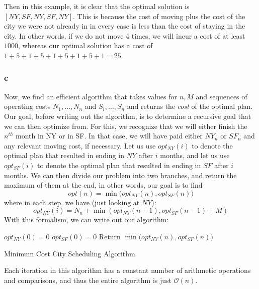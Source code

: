 \documentclass[11pt,letterpaper]{article}
\begin{document}
Then in this example, it is clear that the optimal solution is $[NY, SF, NY, SF, NY]$. This is because the cost of moving plus the cost of the city we were not already in in every case is less than the cost of staying in the city. In other words, if we do not move 4 times, we will incur a cost of at least $1000$, whereas our optimal solution has a cost of $1 + 5 + 1 + 5 + 1 + 5 + 1 + 5 + 1 = 25$. 

\subsubsection*{c} Now, we find an efficient algorithm that takes values for $n, M$ and sequences of operating costs $N_1,\ldots,N_n$ and $S_i,\ldots,S_n$ and returns the \textit{cost} of the optimal plan. Our goal, before writing out the algorithm, is to determine a recursive goal that we can then optimize from. For this, we recognize that we will either finish the $n^{th}$ month in NY or in SF. In that case, we will have paid either $NY_n$ or $SF_n$ and any relevant moving cost, if necessary. Let us use $opt_{NY}(i)$ to denote the optimal plan that resulted in ending in $NY$ after $i$ months, and let us use $opt_{SF}(i)$ to denote the optimal plan that resulted in ending in $SF$ after $i$ months. We can then divide our problem into two branches, and return the maximum of them at the end, in other words, our goal is to find 
\begin{equation*}
	opt(n) = \min\Big( opt_{NY}(n), opt_{SF}(n) \Big)
\end{equation*}
where in each step, we have (just looking at $NY$):
\begin{equation*}
	opt_{NY}(i) = N_n + \min(opt_{NY}(n - 1), opt_{SF}(n-1) + M)
\end{equation*}
With this formalism, we can write out our algorithm:

\vspace{5mm}
\begin{algorithm}[H]
	$opt_{NY}(0) = 0$\;
	$opt_{SF}(0) = 0$\;
	Return $\min\Big( opt_{NY}(n), opt_{SF}(n) \Big)$
	\caption{Minimum Cost City Scheduling Algorithm}
\end{algorithm}
\vspace{5mm}


Each iteration in this algorithm has a constant number of arithmetic operations and comparisons, and thus the entire algorithm is just $\mathcal{O}(n)$. 
\end{document}
